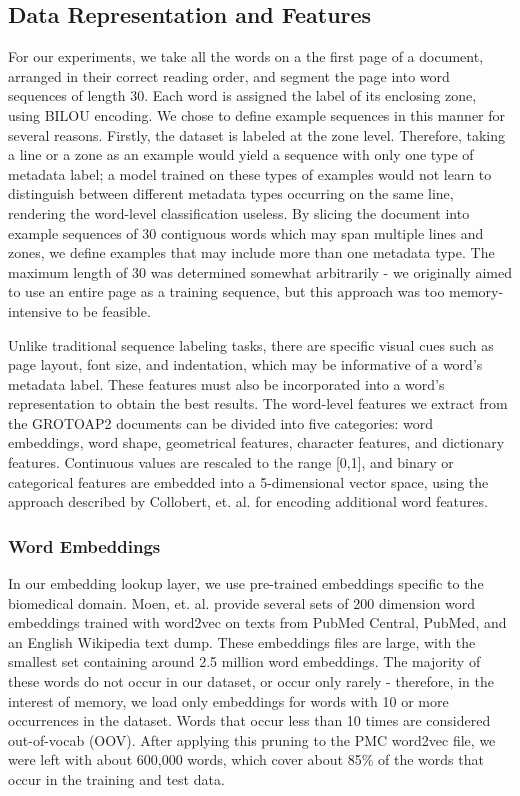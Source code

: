 \documentclass{acm_proc_article-sp}
\begin{document}
\subsection{Data Representation and Features}
For our experiments, we take all the words on a the first page of a document, arranged in their correct reading order, and segment the page into word sequences of length 30. Each word is assigned the label of its enclosing zone, using BILOU encoding. We chose to define example sequences in this manner for several reasons. Firstly, the dataset is labeled at the zone level. Therefore, taking a line or a zone as an example would yield a sequence with only one type of metadata label; a model trained on these types of examples would not learn to distinguish between different metadata types occurring on the same line, rendering the word-level classification useless. By slicing the document into example sequences of 30 contiguous words which may span multiple lines and zones, we define examples that may include more than one metadata type. The maximum length of 30 was determined somewhat arbitrarily - we originally aimed to use an entire page as a training sequence, but this approach was too memory-intensive to be feasible. 

Unlike traditional sequence labeling tasks, there are specific visual cues such as page layout, font size, and indentation, which may be informative of a word’s metadata label. These features must also be incorporated into a word’s representation to obtain the best results. The word-level features we extract from the GROTOAP2 documents can be divided into five categories: word embeddings, word shape, geometrical features, character features, and dictionary features. Continuous values are rescaled to the range [0,1], and binary or categorical features are embedded into a 5-dimensional vector space, using the approach described by Collobert, et. al. for encoding additional word features. \cite{collobert2011natural}

\subsubsection{Word Embeddings}
In our embedding lookup layer, we use pre-trained embeddings specific to the biomedical domain. Moen, et. al. provide several sets of 200 dimension word embeddings trained with word2vec on texts from PubMed Central, PubMed, and an English Wikipedia text dump. \cite{moen2013distributional} These embeddings files are large, with the smallest set containing around 2.5 million word embeddings. The majority of these words do not occur in our dataset, or occur only rarely - therefore, in the interest of memory, we load only embeddings for words with 10 or more occurrences in the dataset. Words that occur less than 10 times are considered out-of-vocab (OOV). After applying this pruning to the PMC word2vec file, we were left with about 600,000 words, which cover about 85\% of the words that occur in the training and test data.
\end{document}
